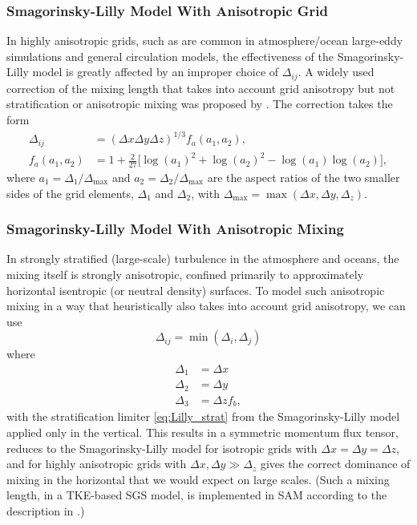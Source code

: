 \documentclass{report}
\begin{document}
\subsubsection{Smagorinsky-Lilly Model With Anisotropic Grid}
 
In highly anisotropic grids, such as are common in atmosphere/ocean large-eddy simulations and general circulation models, the effectiveness of the Smagorinsky-Lilly model is greatly affected by an improper choice of $\Delta_{ij}$. A widely used correction of the mixing length that takes into account grid anisotropy but not stratification or anisotropic mixing was proposed by  \citet{scottiMeneveauLilly1993}. The correction takes the form
\begin{align}
\Delta_{ij} &= (\Delta x \Delta y \Delta z)^{1/3} f_{a}(a_1, a_2),   \\
f_a(a_1, a_2) &= 1+\frac{2}{27}\Big[\log(a_{1})^2 + \log(a_2)^2 -\log(a_1)\log(a_2)\Big],
\end{align}
where  $a_1 =  \Delta_1/\Delta_{\max}$ and $a_2 = \Delta_2/\Delta_{\max}$ are the aspect ratios of the two smaller sides of the grid elements, $\Delta_1$ and $\Delta_2$, with $\Delta_{\max} = \max(\Delta x, \Delta y, \Delta_z)$. 

\subsubsection{Smagorinsky-Lilly Model With Anisotropic Mixing}\label{s:anisotropic_SGS_mixing}

In strongly stratified (large-scale) turbulence in the atmosphere and oceans, the mixing itself is strongly anisotropic, confined primarily to approximately horizontal isentropic (or neutral density) surfaces. To model such anisotropic mixing in a way that heuristically also takes into account grid anisotropy, we can use 
\begin{equation}
\Delta_{ij} = \min(\Delta_i, \Delta_j)  
\end{equation}
where 
\begin{align}
\Delta_1 & = \Delta x \\
\Delta_2 & = \Delta y \\
\Delta_3 & = \Delta z f_b,
\end{align}
with the stratification limiter \eqref{eq:Lilly_strat} from the Smagorinsky-Lilly model applied only in the vertical. This results in a symmetric momentum flux tensor, reduces to the Smagorinsky-Lilly model for isotropic grids with $\Delta x = \Delta y = \Delta z$, and for highly anisotropic grids with $\Delta x, \Delta y \gg \Delta_z$ gives the correct dominance of mixing in the horizontal that we would expect on large scales. (Such a mixing length, in a TKE-based SGS model, is implemented in SAM according to the description in \citet{Stevens05a}.) 
\end{document}
